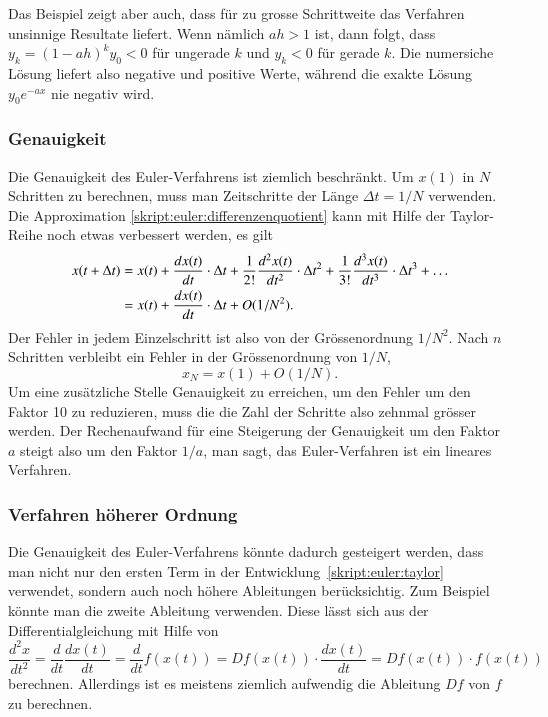 Das Beispiel zeigt aber auch, dass für zu grosse Schrittweite das
Verfahren unsinnige Resultate liefert.
Wenn nämlich $ah>1$ ist, dann folgt, dass
$y_k=(1-ah)^k y_0  <0$ für ungerade $k$ und $y_k < 0$ für gerade $k$.
Die numersiche Lösung liefert also negative und positive Werte,
während die exakte Lösung $y_0e^{-ax}$ nie negativ wird.

\subsubsection{Genauigkeit}
Die Genauigkeit des Euler-Verfahrens ist ziemlich beschränkt.
Um $x(1)$ in $N$ Schritten zu berechnen, muss man Zeitschritte der
Länge $\Delta t=1/N$ verwenden.
Die Approximation \eqref{skript:euler:differenzenquotient} kann mit
Hilfe der Taylor-Reihe noch etwas verbessert werden, es gilt
\begin{align}
x(t+\Delta t)
&=
x(t) + \frac{d x(t) }{dt}\cdot \Delta t
+ \frac{1}{2!}\frac{d^2x(t)}{dt^2}\cdot \Delta t^2
+ \frac{1}{3!}\frac{d^3x(t)}{dt^3}\cdot \Delta t^3
+\dots
\label{skript:euler:taylor}
\\
&=
x(t) + \frac{d x(t) }{dt}\cdot \Delta t
+ O(1/N^2).
\notag
\end{align}
Der Fehler in jedem Einzelschritt ist also von der Grössenordnung $1/N^2$.
Nach $n$ Schritten verbleibt ein Fehler in der Grössenordnung von $1/N$,
\[
x_N = x(1) + O(1/N).
\]
Um eine zusätzliche Stelle Genauigkeit zu erreichen, um den Fehler um
den Faktor 10 zu reduzieren, muss die die Zahl der Schritte also zehnmal 
grösser werden.
Der Rechenaufwand für eine Steigerung der Genauigkeit um den Faktor
$a$ steigt also um den Faktor $1/a$, man sagt, das Euler-Verfahren ist
ein lineares Verfahren.

\subsubsection{Verfahren höherer Ordnung}
Die Genauigkeit des Euler-Verfahrens könnte dadurch gesteigert
werden, dass man nicht nur den ersten Term in der
Entwicklung~\eqref{skript:euler:taylor} verwendet, sondern auch
noch höhere Ableitungen berücksichtig.
Zum Beispiel könnte man die zweite Ableitung verwenden.
Diese lässt sich aus der Differentialgleichung mit Hilfe von
\[
\frac{d^2x}{dt^2}
=
\frac{d}{dt} \frac{dx(t)}{dt}
=
\frac{d}{dt} f(x(t))
=
Df(x(t))\cdot \frac{dx(t)}{dt}
=
Df(x(t))\cdot f(x(t))
\]
berechnen.
Allerdings ist es meistens ziemlich aufwendig die Ableitung $Df$ von $f$ zu
berechnen.

